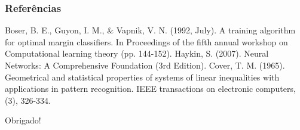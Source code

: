 \documentclass{beamer}
\begin{document}

%
%
%
%
%
%
%


\begin{frame}
\frametitle{Referências}
\footnotesize{
\begin{thebibliography}{99} %
Boser, B. E., Guyon, I. M., \& Vapnik, V. N. (1992, July). A training algorithm for optimal margin classifiers. In Proceedings of the fifth annual workshop on Computational learning theory (pp. 144-152).
Haykin, S. (2007). Neural Networks: A Comprehensive Foundation (3rd Edition).
Cover, T. M. (1965). Geometrical and statistical properties of systems of linear inequalities with applications in pattern recognition. IEEE transactions on electronic computers, (3), 326-334.

\end{thebibliography}
}
\end{frame}


\begin{frame}
\Huge{\centerline{Obrigado!}}
\end{frame}

\end{document}
